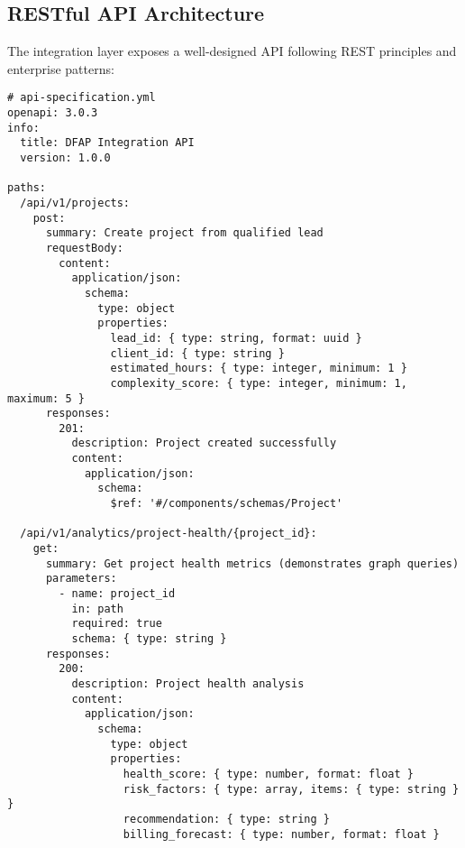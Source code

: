 \subsection{RESTful API Architecture}

The integration layer exposes a well-designed API following REST principles and enterprise patterns:

\begin{verbatim}
# api-specification.yml
openapi: 3.0.3
info:
  title: DFAP Integration API
  version: 1.0.0
  
paths:
  /api/v1/projects:
    post:
      summary: Create project from qualified lead
      requestBody:
        content:
          application/json:
            schema:
              type: object
              properties:
                lead_id: { type: string, format: uuid }
                client_id: { type: string }
                estimated_hours: { type: integer, minimum: 1 }
                complexity_score: { type: integer, minimum: 1, maximum: 5 }
      responses:
        201:
          description: Project created successfully
          content:
            application/json:
              schema:
                $ref: '#/components/schemas/Project'
                
  /api/v1/analytics/project-health/{project_id}:
    get:
      summary: Get project health metrics (demonstrates graph queries)
      parameters:
        - name: project_id
          in: path
          required: true
          schema: { type: string }
      responses:
        200:
          description: Project health analysis
          content:
            application/json:
              schema:
                type: object
                properties:
                  health_score: { type: number, format: float }
                  risk_factors: { type: array, items: { type: string } }
                  recommendation: { type: string }
                  billing_forecast: { type: number, format: float }
\end{verbatim} 